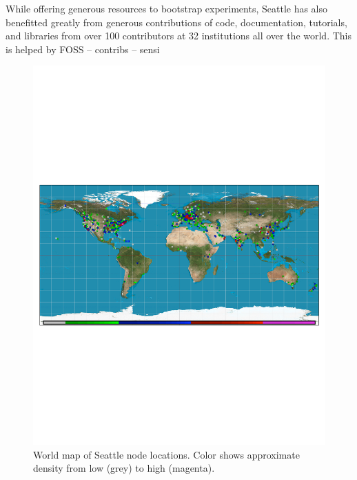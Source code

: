 While offering generous resources to bootstrap experiments,
Seattle has also benefitted greatly from generous contributions
of code, documentation, tutorials, and libraries from over 100
contributors at 32 institutions all over the world.
This is helped by
FOSS -- contribs -- sensi

\begin{figure}
  \centering
  \includegraphics[width=\columnwidth]{figures/finishedmap_ipinfo_small.pdf}
  \caption{World map of Seattle node locations. Color shows approximate density from low (grey) to high (magenta).}
  \label{fig:map}
\end{figure}
